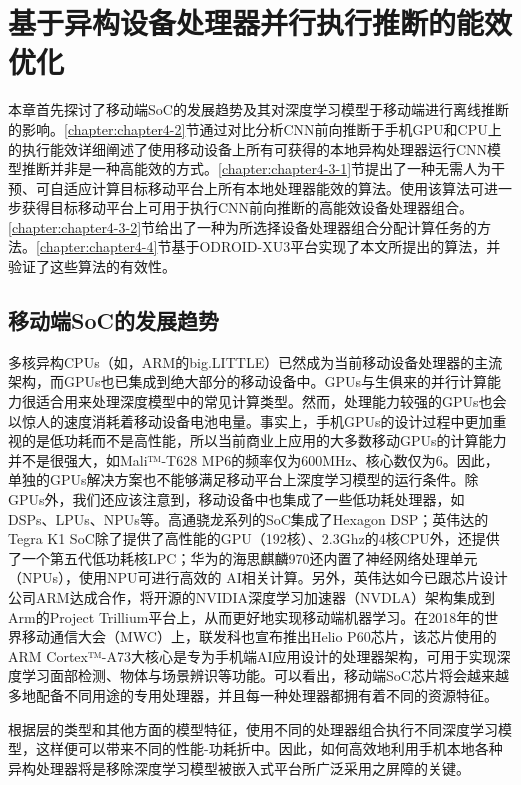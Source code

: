 \chapter{基于异构设备处理器并行执行推断的能效优化}
\label{chapter:chapter4}

本章首先探讨了移动端SoC的发展趋势及其对深度学习模型于移动端进行离线推断的影响。\ref{chapter:chapter4-2}节通过对比分析CNN前向推断于手机GPU和CPU上的执行能效详细阐述了使用移动设备上所有可获得的本地异构处理器运行CNN模型推断并非是一种高能效的方式。\ref{chapter:chapter4-3-1}节提出了一种无需人为干预、可自适应计算目标移动平台上所有本地处理器能效的算法。使用该算法可进一步获得目标移动平台上可用于执行CNN前向推断的高能效设备处理器组合。\ref{chapter:chapter4-3-2}节给出了一种为所选择设备处理器组合分配计算任务的方法。\ref{chapter:chapter4-4}节基于ODROID-XU3平台实现了本文所提出的算法，并验证了这些算法的有效性。

\section{移动端SoC的发展趋势}
\label{chapter:chapter4-1}
多核异构CPUs（如，ARM的big.LITTLE\cite{chung2012heterogeneous}）已然成为当前移动设备处理器的主流架构，而GPUs也已集成到绝大部分的移动设备中。GPUs与生俱来的并行计算能力很适合用来处理深度模型中的常见计算类型。然而，处理能力较强的GPUs也会以惊人的速度消耗着移动设备电池电量。事实上，手机GPUs的设计过程中更加重视的是低功耗而不是高性能，所以当前商业上应用的大多数移动GPUs的计算能力并不是很强大，如Mali™-T628 MP6的频率仅为600MHz、核心数仅为6。因此，单独的GPUs解决方案也不能够满足移动平台上深度学习模型的运行条件。除GPUs外，我们还应该注意到，移动设备中也集成了一些低功耗处理器，如DSPs、LPUs、NPUs等。高通骁龙系列的SoC集成了Hexagon DSP；英伟达的Tegra K1 SoC除了提供了高性能的GPU（192核）、2.3Ghz的4核CPU外，还提供了一个第五代低功耗核LPC；华为的海思麒麟970还内置了神经网络处理单元（NPUs），使用NPU可进行高效的 AI相关计算。另外，英伟达如今已跟芯片设计公司ARM达成合作，将开源的NVIDIA深度学习加速器（NVDLA）架构集成到Arm的Project Trillium平台上，从而更好地实现移动端机器学习。在2018年的世界移动通信大会（MWC）上，联发科也宣布推出Helio P60芯片，该芯片使用的ARM Cortex™-A73大核心是专为手机端AI应用设计的处理器架构，可用于实现深度学习面部检测、物体与场景辨识等功能。可以看出，移动端SoC芯片将会越来越多地配备不同用途的专用处理器，并且每一种处理器都拥有着不同的资源特征。

根据层的类型和其他方面的模型特征，使用不同的处理器组合执行不同深度学习模型，这样便可以带来不同的性能-功耗折中。因此，如何高效地利用手机本地各种异构处理器将是移除深度学习模型被嵌入式平台所广泛采用之屏障的关键\cite{attia2015dynamic}。


